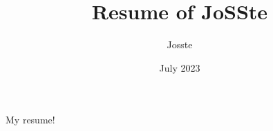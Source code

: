 \documentclass{article}
\title{Resume of JoSSte}
\author{Josste}
\date{July 2023}
\begin{document}
   \maketitle
   My resume!
   \tableofcontents{}
\end{document}
